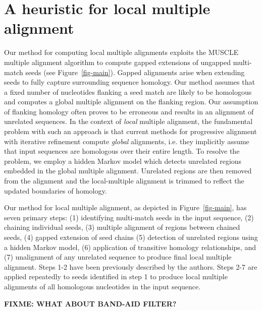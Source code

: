 \documentclass{llncs}
\begin{document}
\section{A heuristic for local multiple alignment}
Our method for computing local multiple alignments exploits the MUSCLE
multiple alignment algorithm to compute gapped extensions of ungapped
multi-match seeds (see Figure~\ref{fig-main}). Gapped alignments arise
when extending seeds to fully capture surrounding sequence
homology. Our method assumes that a fixed number of nucleotides
flanking a seed match are likely to be homologous and computes a
global multiple alignment on the flanking region.  Our assumption of
flanking homology often proves to be erroneous and results in an
alignment of unrelated sequences.  In the context of \textit{local}
multiple alignment, the fundamental problem with such an approach is
that current methods for progressive alignment with iterative
refinement compute \textit{global} alignments, i.e. they implicitly
assume that input sequences are homologous over their entire length.
To resolve the problem, we employ a hidden Markov model which detects
unrelated regions embedded in the global multiple alignment.
Unrelated regions are then removed from the alignment and the
local-multiple alignment is trimmed to reflect the updated boundaries
of homology.

Our method for local multiple alignment, as depicted in
Figure~\ref{fig-main}, has seven primary steps: (1) identifying
multi-match seeds in the input sequence, (2) chaining individual
seeds, (3) multiple alignment of regions between chained seeds, (4)
gapped extension of seed chains (5) detection of unrelated regions
using a hidden Markov model, (6) application of transitive homology
relationships, and (7) unalignment of any unrelated sequence to
produce final local multiple alignment.  Steps 1-2 have been previously 
described by the authors\cite{ref-procrast}. Steps 2-7 are applied
repeatedly to seeds identified in step 1 to produce local multiple
alignments of all homologous nucleotides in the input sequence.

\textbf{FIXME: WHAT ABOUT BAND-AID FILTER?}
\end{document}
